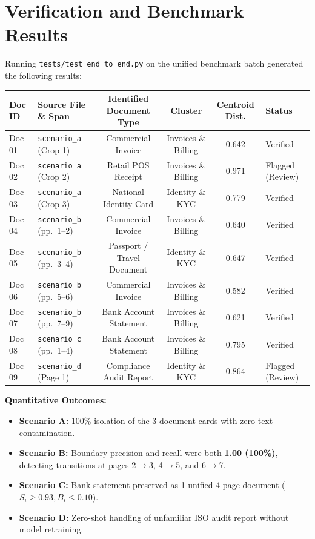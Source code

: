 \documentclass[11pt,a4paper]{article}
\begin{document}
\section{Verification and Benchmark Results}
Running \texttt{tests/test\_end\_to\_end.py} on the unified benchmark batch generated the following results:

\begin{center}
\small
\begin{tabular}{@{}llcccl@{}}
\toprule
\textbf{Doc ID} & \textbf{Source File \& Span} & \textbf{Identified Document Type} & \textbf{Cluster} & \textbf{Centroid Dist.} & \textbf{Status} \\ \midrule
Doc 01 & \texttt{scenario\_a} (Crop 1) & Commercial Invoice & Invoices \& Billing & 0.642 & Verified \\
Doc 02 & \texttt{scenario\_a} (Crop 2) & Retail POS Receipt & Invoices \& Billing & 0.971 & Flagged (Review) \\
Doc 03 & \texttt{scenario\_a} (Crop 3) & National Identity Card & Identity \& KYC & 0.779 & Verified \\
Doc 04 & \texttt{scenario\_b} (pp.~1--2) & Commercial Invoice & Invoices \& Billing & 0.640 & Verified \\
Doc 05 & \texttt{scenario\_b} (pp.~3--4) & Passport / Travel Document & Identity \& KYC & 0.647 & Verified \\
Doc 06 & \texttt{scenario\_b} (pp.~5--6) & Commercial Invoice & Invoices \& Billing & 0.582 & Verified \\
Doc 07 & \texttt{scenario\_b} (pp.~7--9) & Bank Account Statement & Invoices \& Billing & 0.621 & Verified \\
Doc 08 & \texttt{scenario\_c} (pp.~1--4) & Bank Account Statement & Invoices \& Billing & 0.795 & Verified \\
Doc 09 & \texttt{scenario\_d} (Page 1) & Compliance Audit Report & Identity \& KYC & 0.864 & Flagged (Review) \\ \bottomrule
\end{tabular}
\end{center}

\textbf{Quantitative Outcomes:}
\begin{itemize}[leftmargin=*, noitemsep]
    \item \textbf{Scenario A:} 100\% isolation of the 3 document cards with zero text contamination.
    \item \textbf{Scenario B:} Boundary precision and recall were both \textbf{1.00 (100\%)}, detecting transitions at pages 2$\to$3, 4$\to$5, and 6$\to$7.
    \item \textbf{Scenario C:} Bank statement preserved as 1 unified 4-page document ($S_i \ge 0.93, B_i \le 0.10$).
    \item \textbf{Scenario D:} Zero-shot handling of unfamiliar ISO audit report without model retraining.
\end{itemize}
\end{document}
